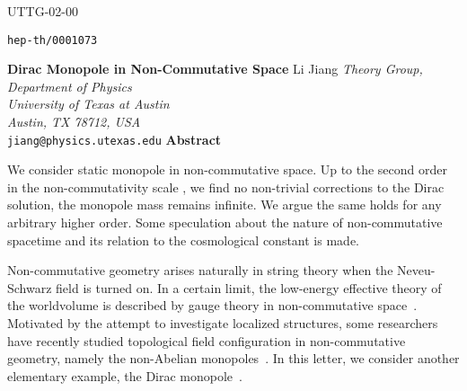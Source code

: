 \documentclass[a4paper,12pt]{article}
\begin{document}
\begin{titlepage}
\rm
\normalsize
\begin{flushright} 
UTTG-02-00

\texttt{hep-th/0001073}
\end{flushright} 
\vskip 2.5cm
\begin{center}
{\Large \bf Dirac Monopole in Non-Commutative Space}
\vskip 1.5cm
Li Jiang
\vskip 0.5cm
\textit{Theory Group, Department of Physics\\
        University of Texas at Austin\\
        Austin, TX 78712, USA\\}
\texttt{jiang@physics.utexas.edu}
\vskip 3.5cm
\textbf{Abstract}
\end{center}
\vskip 0.5cm
\noindent We consider static \coordHE{} monopole in non-commutative space.
Up to the second order in the non-commutativity scale \myHighlight{$\theta$}\coordHE{}, we
f\mbox{}ind no non-trivial corrections to the Dirac solution, the monopole
mass remains inf\mbox{}inite. We argue the
same holds for any arbitrary higher order. Some speculation about the
nature of non-commutative spacetime and its relation to the cosmological
constant is made.  
\end{titlepage}

\noindent Non-commutative geometry arises naturally in string theory
when the Neveu-Schwarz \coordHE{} f\mbox{}ield is turned on. In a certain limit,
the low-energy ef\mbox{}fective theory of the worldvolume  is described 
by gauge theory in 
non-commutative space~\cite{sw}. Motivated by the attempt to investigate
localized structures, some researchers have recently studied topological 
f\mbox{}ield conf\mbox{}iguration
in non-commutative geometry, namely the non-Abelian monopoles~\cite{hh,hhm,db}.
In this letter, we consider another elementary example, the Dirac 
monopole~\cite{pd}.
\end{document}
